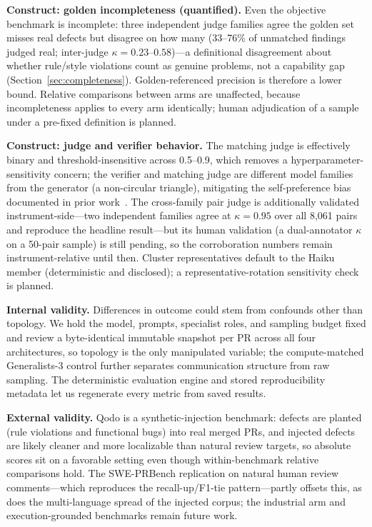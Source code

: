 \documentclass[conference]{IEEEtran}
\begin{document}
\textbf{Construct: golden incompleteness (quantified).} Even the objective
benchmark is incomplete: three independent judge families agree the golden
set misses real defects but disagree on how many (33--76\% of unmatched
findings judged real; inter-judge $\kappa{=}0.23$--$0.58$)---a
definitional disagreement about whether rule/style violations count as
genuine problems, not a capability gap
(Section~\ref{sec:completeness}). Golden-referenced precision is therefore
a lower bound. Relative comparisons between arms are unaffected, because
incompleteness applies to every arm identically; human adjudication of a
sample under a pre-fixed definition is planned.

\textbf{Construct: judge and verifier behavior.} The matching judge is
effectively binary and threshold-insensitive across 0.5--0.9, which removes
a hyperparameter-sensitivity concern; the verifier and matching judge are
different model families from the generator (a non-circular triangle),
mitigating the self-preference bias documented in prior
work~\cite{panickssery}. The cross-family pair judge is additionally
validated instrument-side---two independent families agree at
$\kappa{=}0.95$ over all 8{,}061 pairs and reproduce the headline
result---but its human validation (a dual-annotator $\kappa$ on a 50-pair
sample) is still pending, so the corroboration numbers remain
instrument-relative until then. Cluster representatives default to the
Haiku member (deterministic and disclosed); a representative-rotation
sensitivity check is planned.

\textbf{Internal validity.} Differences in outcome could stem from confounds
other than topology. We hold the model, prompts, specialist roles, and
sampling budget fixed and review a byte-identical immutable snapshot per PR
across all four architectures, so topology is the only manipulated variable;
the compute-matched Generalists-3 control further separates communication
structure from raw sampling. The deterministic evaluation engine and stored
reproducibility metadata let us regenerate every metric from saved results.

\textbf{External validity.} Qodo is a synthetic-injection benchmark:
defects are planted (rule violations and functional bugs) into real merged
PRs, and injected defects are likely cleaner and more localizable than
natural review targets, so absolute scores sit on a favorable setting even
though within-benchmark relative comparisons hold. The SWE-PRBench
replication on natural human review comments---which reproduces the
recall-up/F1-tie pattern---partly offsets this, as does the multi-language
spread of the injected corpus; the industrial arm and execution-grounded
benchmarks remain future work.
\end{document}
